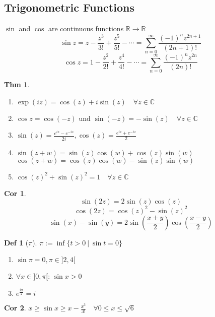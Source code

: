 \documentclass[a4paper, 10pt]{article}
\newtheorem*{corollary}{Cor}
\theoremstyle{definition}
\newtheorem*{theorem}{Thm}
\newtheorem*{definition}{Def}
\theoremstyle{named}
\newcommand{\R}{\mathbb{R}}
\newcommand{\C}{\mathbb{C}}
\begin{document}
\subsection{Trigonometric Functions}
$\sin$ and $\cos$ are continuous functions $\R \to \R$
$$\sin z = z - \frac{z^3}{3!} + \frac{z^5}{5!} - \cdots = \sum_{n = 0}^\infty \frac{(-1)^n z^{2n + 1}}{(2n + 1)!}$$
$$\cos z = 1 - \frac{z^2}{2!} + \frac{z^4}{4!} - \cdots = \sum_{n = 0}^\infty \frac{(-1)^n z^{2n}}{(2n)!}$$

\begin{theorem}
    \begin{enumerate}
        \item $\exp(iz) = \cos(z) +i\sin(z) \quad \forall z \in \C$
        \item $\cos z = \cos(-z) \text{ und } \sin(-z) = - \sin(z) \quad \forall z \in \C$
        \item $\sin(z) = \frac{e^{iz}-e^{-iz}}{2i}, \cos(z) = \frac{e^{iz}+e^{-iz}}{2}$
        \item $\sin(z+w) = \sin(z)\cos(w) + \cos(z)\sin(w)$ \\
            $\cos(z+w) = \cos(z)\cos(w) - \sin(z)\sin(w)$
        \item $\cos(z)^2+\sin(z)^2 = 1 \quad \forall z \in \mathbb{C}$
    \end{enumerate}
\end{theorem}

\begin{corollary}
    $$\sin(2z) = 2 \sin(z)\cos(z)$$
    $$\cos(2z) = \cos(z)^2 - \sin(z)^2$$
    $$\sin(x) - \sin(y) = 2 \sin\left(\frac{x + y}{2}\right)\cos\left(\frac{x - y}{2}\right)$$
\end{corollary}

\begin{definition}[$\pi$]
    $\pi := \inf \{ t > 0 \ | \ \sin t = 0\}$
    \begin{enumerate}[label=(\roman*)]
        \item $\sin \pi = 0, \pi \in ]2, 4[$
        \item $\forall x \in ]0, \pi[$: $\sin x > 0$
        \item $e^{\frac{i \pi}{2}} = i$
    \end{enumerate}
\end{definition}

\begin{corollary}
    $x \geq \sin x \geq x - \frac{x^3}{3!} \quad \forall 0 \leq x \leq \sqrt{6}$
\end{corollary}
\end{document}
